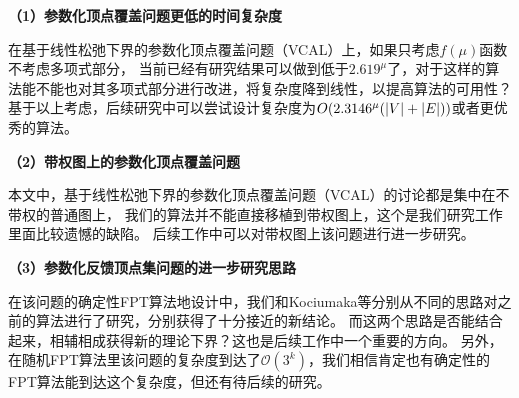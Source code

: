 \textbf{（1）参数化顶点覆盖问题更低的时间复杂度} 

在基于线性松弛下界的参数化顶点覆盖问题（VCAL）上，如果只考虑$f(\mu)$函数不考虑多项式部分，
当前已经有研究结果可以做到低于$2.619^\mu$了，对于这样的算法能不能也对其多项式部分进行改进，将复杂度降到线性，以提高算法的可用性？
基于以上考虑，后续研究中可以尝试设计复杂度为$O(2.3146^\mu(\left\vert V \right\vert + \left\vert E \right\vert))$或者更优秀的算法。
   
\textbf{（2）带权图上的参数化顶点覆盖问题} 

本文中，基于线性松弛下界的参数化顶点覆盖问题（VCAL）的讨论都是集中在不带权的普通图上，
我们的算法并不能直接移植到带权图上，这个是我们研究工作里面比较遗憾的缺陷。
后续工作中可以对带权图上该问题进行进一步研究。
   
\textbf{（3）参数化反馈顶点集问题的进一步研究思路} 

在该问题的确定性FPT算法地设计中，我们和Kociumaka等分别从不同的思路对之前的算法进行了研究，分别获得了十分接近的新结论。
而这两个思路是否能结合起来，相辅相成获得新的理论下界？这也是后续工作中一个重要的方向。
另外，在随机FPT算法里该问题的复杂度到达了$\mathcal{O}(3^k)$，我们相信肯定也有确定性的FPT算法能到达这个复杂度，但还有待后续的研究。